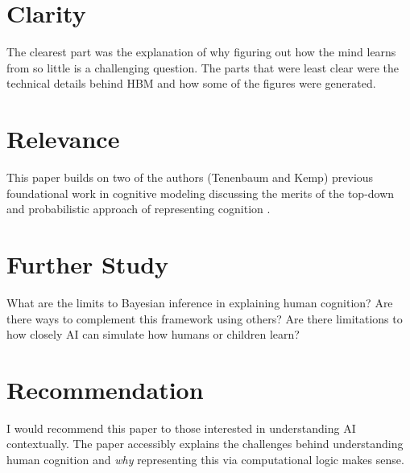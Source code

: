 \documentclass[12pt, letterpaper]{article}
\begin{document}

\section{Clarity}
\label{sec:clarity}
The clearest part was the explanation of why figuring out how the mind learns from so little is a challenging question. The parts that were least clear were the technical details behind HBM and how some of the figures were generated.

\section{Relevance}
\label{sec:relevance}
This paper builds on two of the authors (Tenenbaum and Kemp) previous foundational work in cognitive modeling discussing the merits of the top-down and probabilistic approach of representing cognition \cite{GRIFFITHS2010357}.

\section{Further Study}
\label{sec:further}
What are the limits to Bayesian inference in explaining human cognition? Are there ways to complement this framework using others? Are there limitations to how closely AI can simulate how humans or children learn? 

\section{Recommendation}
\label{sec:rec}
I would recommend this paper to those interested in understanding AI contextually. The paper accessibly explains the challenges behind understanding human cognition and \emph{why} representing this via computational logic makes sense.

\end{document}
